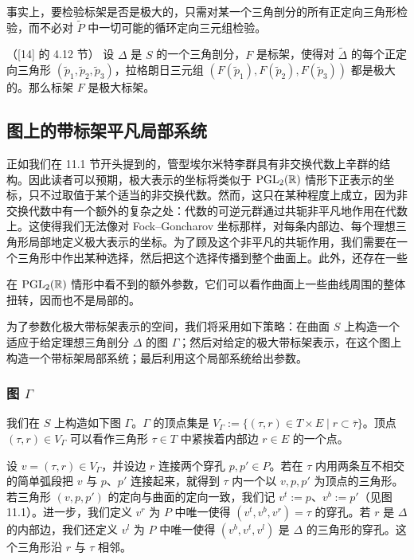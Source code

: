事实上，要检验标架是否是极大的，只需对某一个三角剖分的所有正定向三角形检验，而不必对 $\tilde P$ 中一切可能的循环定向三元组检验。

\begin{proposition}[11.27]（{[14]} 的 4.12 节）
设 $\Delta$ 是 $S$ 的一个三角剖分，$F$ 是标架，使得对 $\tilde\Delta$ 的每个正定向三角形 $(\tilde p_1,\tilde p_2,\tilde p_3)$，拉格朗日三元组 $(F(\tilde p_1),F(\tilde p_2),F(\tilde p_3))$ 都是极大的。那么标架 $F$ 是极大标架。
\end{proposition}

\subsection{图上的带标架平凡局部系统}

正如我们在 11.1 节开头提到的，管型埃尔米特李群具有非交换代数上辛群的结构。因此读者可以预期，极大表示的坐标将类似于 $\operatorname{PGL}_2(\mathbb{R})$ 情形下正表示的坐标，只不过取值于某个适当的非交换代数。然而，这只在某种程度上成立，因为非交换代数中有一个额外的复杂之处：代数的可逆元群通过共轭非平凡地作用在代数上。这使得我们无法像对 Fock--Goncharov 坐标那样，对每条内部边、每个理想三角形局部地定义极大表示的坐标。为了顾及这个非平凡的共轭作用，我们需要在一个三角形中作出某种选择，然后把这个选择传播到整个曲面上。此外，还存在一些


在 $\operatorname{PGL}_2(\mathbb{R})$ 情形中看不到的额外参数，它们可以看作曲面上一些曲线周围的整体扭转，因而也不是局部的。

为了参数化极大带标架表示的空间，我们将采用如下策略：在曲面 $S$ 上构造一个适应于给定理想三角剖分 $\Delta$ 的图 $\Gamma$；然后对给定的极大带标架表示，在这个图上构造一个带标架局部系统；最后利用这个局部系统给出参数。

\subsubsection{图 $\Gamma$}

我们在 $S$ 上构造如下图 $\Gamma$。$\Gamma$ 的顶点集是 $V_\Gamma:=\{(\tau,r)\in T\times E\mid r\subset\bar\tau\}$。顶点 $(\tau,r)\in V_\Gamma$ 可以看作三角形 $\tau\in T$ 中紧挨着内部边 $r\in E$ 的一个点。


设 $v=(\tau,r)\in V_\Gamma$，并设边 $r$ 连接两个穿孔 $p,p'\in P$。若在 $\tau$ 内用两条互不相交的简单弧段把 $v$ 与 $p$、$p'$ 连接起来，就得到 $\tau$ 内一个以 $v,p,p'$ 为顶点的三角形。若三角形 $(v,p,p')$ 的定向与曲面的定向一致，我们记 $v^{t}:=p$、$v^{b}:=p'$（见图 11.1）。进一步，我们定义 $v^{r}$ 为 $P$ 中唯一使得 $(v^{t},v^{b},v^{r})=\tau$ 的穿孔。若 $r$ 是 $\Delta$ 的内部边，我们还定义 $v^{l}$ 为 $P$ 中唯一使得 $(v^{b},v^{t},v^{l})$ 是 $\Delta$ 的三角形的穿孔。这个三角形沿 $r$ 与 $\tau$ 相邻。

